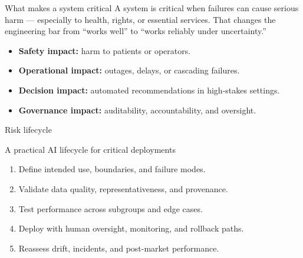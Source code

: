 \documentclass[aspectratio=169]{beamer}
\begin{document}
\begin{frame}{What makes a system critical}
A system is critical when failures can cause serious harm --- especially to health, rights, or essential services. That changes the engineering bar from ``works well'' to ``works reliably under uncertainty.''
\begin{itemize}
  \item \textbf{Safety impact:} harm to patients or operators.
  \item \textbf{Operational impact:} outages, delays, or cascading failures.
  \item \textbf{Decision impact:} automated recommendations in high-stakes settings.
  \item \textbf{Governance impact:} auditability, accountability, and oversight.
\end{itemize}
\end{frame}

\begin{frame}{Risk lifecycle}
\begin{block}{A practical AI lifecycle for critical deployments}
  \begin{enumerate}
    \item Define intended use, boundaries, and failure modes.
    \item Validate data quality, representativeness, and provenance.
    \item Test performance across subgroups and edge cases.
    \item Deploy with human oversight, monitoring, and rollback paths.
    \item Reassess drift, incidents, and post-market performance.
  \end{enumerate}
\end{block}
\end{frame}
\end{document}
